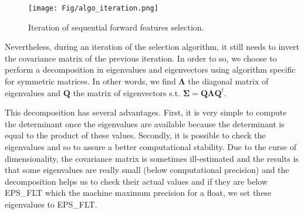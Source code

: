 \documentclass[a4paper,11pt,DIV=16]{scrartcl}
\begin{document}
        \begin{figure}[!ht]
            \centering
            \setlength{\tabcolsep}{2pt}
            \texttt{[image: Fig/algo\_iteration.png]}
            \caption{Iteration of sequential forward features selection.\label{fig:opt_computation}}
        \end{figure}

        Nevertheless, during an iteration of the selection algorithm, it still needs to invert the covariance matrix of the previous iteration. In order to so, we choose to perform a decomposition in eigenvalues and eigenvectors using algorithm specific for symmetric matrices. In other words, we find $\boldsymbol{\Lambda}$ the diagonal matrix of eigenvalues and $\mathbf{Q}$ the matrix of eigenvectors s.t. $\boldsymbol{\Sigma} = \mathbf{Q} \boldsymbol{\Lambda} \mathbf{Q}^t$.

        This decomposition has several advantages. First, it is very simple to compute the determinant once the eigenvalues are available because the determinant is equal to the product of these values. Secondly, it is possible to check the eigenvalues and so to assure a better computational stability. Due to the curse of dimensionality, the covariance matrix is sometimes ill-estimated and the results is that some eigenvalues are really small (below computational precision) and the decomposition helps us to check their actual values and if they are below EPS\_FLT which the machine maximum precision for a float, we set these eigenvalues to EPS\_FLT.




\end{document}
